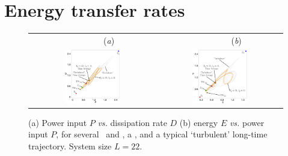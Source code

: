 \section{Energy transfer rates} %
\label{sec:energyL22}

\begin{figure}[t]
\begin{center}
 \begin{tabular}{cc}
		~~~~~~~~(\textit{a})						&	~~~~~~~~(\textit{b}) \\
 	\includegraphics[width=0.46\textwidth]{figs/energyBalance_pst.eps} 	& \includegraphics[width=0.46\textwidth]{figs/equivaEP_pst.eps} 

  \end{tabular}
\end{center}
\caption{
(a) Power input $P$ {\em vs.}
dissipation rate $D$
(b) energy $E$  {\em vs.}
power input $P$,   for several  \eqva\ and \reqva,
a \rpo , and a typical `turbulent' long-time trajectory.
System size $L=22$.
        }
\label{f:drivedrag}
\end{figure}

